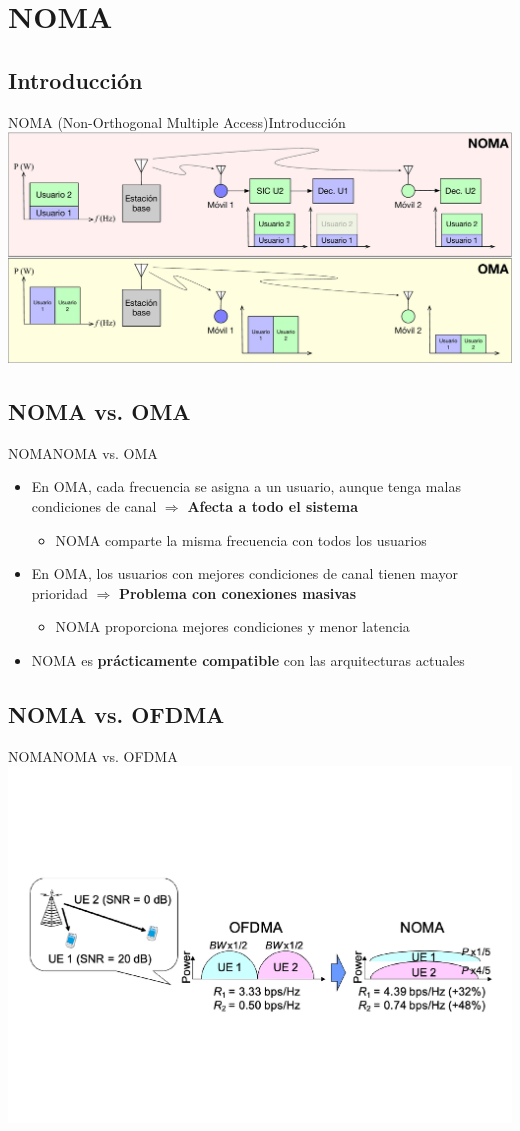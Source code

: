 \documentclass[10pt,compress]{beamer} %
\begin{document}
\section{NOMA}
\subsection{Introducción}
\begin{frame}{NOMA (Non-Orthogonal Multiple Access)}{Introducción}
  \centering \includegraphics[width=0.8\linewidth]{Figuras/NOMA.pdf}
\end{frame}

\subsection{NOMA vs. OMA}
\begin{frame}{NOMA}{NOMA vs. OMA}
  \begin{itemize}
    \item En OMA, cada frecuencia se asigna a un usuario, aunque tenga malas condiciones de canal $\Rightarrow$ {\bf Afecta a todo el sistema}
    \begin{itemize}
      \item NOMA comparte la misma frecuencia con todos los usuarios
    \end{itemize}
    \item En OMA, los usuarios con mejores condiciones de canal tienen mayor prioridad $\Rightarrow$ {\bf Problema con conexiones masivas}
    \begin{itemize}
      \item NOMA proporciona mejores condiciones y menor latencia
    \end{itemize}
    \item NOMA es {\bf prácticamente compatible} con las arquitecturas actuales
  \end{itemize}
\end{frame}


\subsection{NOMA vs. OFDMA}
\begin{frame}{NOMA}{NOMA vs. OFDMA}
  \centering \includegraphics[width=0.8\linewidth]{Figuras/NOMA_OFDMA.pdf}
\end{frame}
\end{document}

